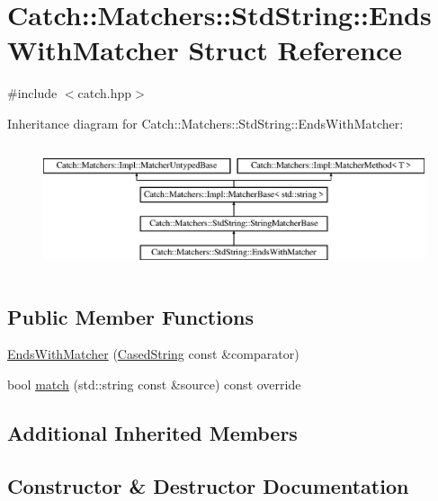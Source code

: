 \hypertarget{struct_catch_1_1_matchers_1_1_std_string_1_1_ends_with_matcher}{}\section{Catch\+:\+:Matchers\+:\+:Std\+String\+:\+:Ends\+With\+Matcher Struct Reference}
\label{struct_catch_1_1_matchers_1_1_std_string_1_1_ends_with_matcher}


{\ttfamily \#include $<$catch.\+hpp$>$}

Inheritance diagram for Catch\+:\+:Matchers\+:\+:Std\+String\+:\+:Ends\+With\+Matcher\+:\begin{figure}[H]
\begin{center}
\leavevmode
\includegraphics[height=3.758389cm]{struct_catch_1_1_matchers_1_1_std_string_1_1_ends_with_matcher}
\end{center}
\end{figure}
\subsection*{Public Member Functions}
\begin{DoxyCompactItemize}
\item 
\mbox{\hyperlink{struct_catch_1_1_matchers_1_1_std_string_1_1_ends_with_matcher_aa5ec700b4629562f74f362080accfd7b}{Ends\+With\+Matcher}} (\mbox{\hyperlink{struct_catch_1_1_matchers_1_1_std_string_1_1_cased_string}{Cased\+String}} const \&comparator)
\item 
bool \mbox{\hyperlink{struct_catch_1_1_matchers_1_1_std_string_1_1_ends_with_matcher_aca2741fa57374a2a98d2a84ac3e13a6d}{match}} (std\+::string const \&source) const override
\end{DoxyCompactItemize}
\subsection*{Additional Inherited Members}


\subsection{Constructor \& Destructor Documentation}
\mbox{\label{struct_catch_1_1_matchers_1_1_std_string_1_1_ends_with_matcher_aa5ec700b4629562f74f362080accfd7b}} 

